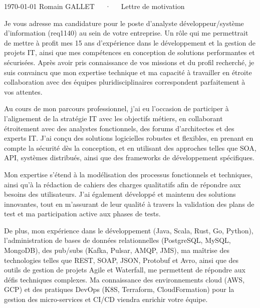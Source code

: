 \documentclass[11pt, a4paper]{awesome-cv}
\begin{document}
\makecvheader[R]

\makecvfooter
  {\today}
  {Romain GALLET~~~·~~~Lettre de motivation}
  {}

\makelettertitle

\begin{cvletter}

Je vous adresse ma candidature pour le poste d'analyste développeur/système d'information (req1140) au sein de votre entreprise. Un rôle qui me permettrait de mettre à profit mes 15 ans d’expérience dans le développement et la gestion de projets IT, ainsi que mes compétences en conception de solutions performantes et sécurisées. Après avoir pris connaissance de vos missions et du profil recherché, je suis convaincu que mon expertise technique et ma capacité à travailler en étroite collaboration avec des équipes pluridisciplinaires correspondent parfaitement à vos attentes.

Au cours de mon parcours professionnel, j’ai eu l’occasion de participer à l’alignement de la stratégie IT avec les objectifs métiers, en collaborant étroitement avec des analystes fonctionnels, des forums d'architectes et des experts IT. J’ai conçu des solutions logicielles robustes et flexibles, en prenant en compte la sécurité dès la conception, et en utilisant des approches telles que SOA, API, systèmes distribués, ainsi que des frameworks de développement spécifiques.

Mon expertise s’étend à la modélisation des processus fonctionnels et techniques, ainsi qu’à la rédaction de cahiers des charges qualitatifs afin de répondre aux besoins des utilisateurs. J'ai également développé et maintenu des solutions innovantes, tout en m’assurant de leur qualité à travers la validation des plans de test et ma participation active aux phases de tests.

De plus, mon expérience dans le développement (Java, Scala, Rust, Go, Python), l’administration de bases de données relationnelles (PostgreSQL, MySQL, MongoDB), des pub/subs (Kafka, Pulsar, AMQP, JMS), ma maîtrise des technologies telles que REST, SOAP, JSON, Protobuf et Avro, ainsi que des outils de gestion de projets Agile et Waterfall, me permettent de répondre aux défis techniques complexes. Ma connaissance des environnements cloud (AWS, GCP) et des pratiques DevOps (K8S, Terraform, CloudFormation) pour la gestion des micro-services et CI/CD viendra enrichir votre équipe.


\end{cvletter}
\end{document}
